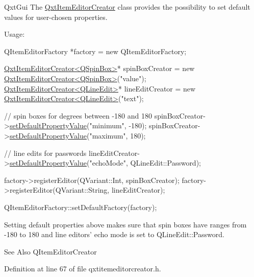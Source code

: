 Qxt\-Gui The \hyperlink{class_qxt_item_editor_creator}{Qxt\-Item\-Editor\-Creator} class provides the possibility to set default values for user-\/chosen properties.

Usage\-: 
\begin{DoxyCode}
QItemEditorFactory *factory = \textcolor{keyword}{new} QItemEditorFactory;

\hyperlink{class_qxt_item_editor_creator}{QxtItemEditorCreator<QSpinBox>}* spinBoxCreator = \textcolor{keyword}{new} 
      \hyperlink{class_qxt_item_editor_creator}{QxtItemEditorCreator<QSpinBox>}(\textcolor{stringliteral}{"value"});
\hyperlink{class_qxt_item_editor_creator}{QxtItemEditorCreator<QLineEdit>}* lineEditCreator = \textcolor{keyword}{new} 
      \hyperlink{class_qxt_item_editor_creator}{QxtItemEditorCreator<QLineEdit>}(\textcolor{stringliteral}{"text"});

\textcolor{comment}{// spin boxes for degrees between -180 and 180}
spinBoxCreator->\hyperlink{class_qxt_item_editor_creator_base_a2864edf86fe3807916d7db88db899f13}{setDefaultPropertyValue}(\textcolor{stringliteral}{"minimum"}, -180);
spinBoxCreator->\hyperlink{class_qxt_item_editor_creator_base_a2864edf86fe3807916d7db88db899f13}{setDefaultPropertyValue}(\textcolor{stringliteral}{"maximum"}, 180);

\textcolor{comment}{// line edits for passwords}
lineEditCreator->\hyperlink{class_qxt_item_editor_creator_base_a2864edf86fe3807916d7db88db899f13}{setDefaultPropertyValue}(\textcolor{stringliteral}{"echoMode"}, QLineEdit::Password);

factory->registerEditor(QVariant::Int, spinBoxCreator);
factory->registerEditor(QVariant::String, lineEditCreator);

QItemEditorFactory::setDefaultFactory(factory);
\end{DoxyCode}


Setting default properties above makes sure that spin boxes have ranges from -\/180 to 180 and line editors' echo mode is set to Q\-Line\-Edit\-::\-Password.

\begin{DoxySeeAlso}{See Also}
Q\-Item\-Editor\-Creator 
\end{DoxySeeAlso}


Definition at line 67 of file qxtitemeditorcreator.\-h.



